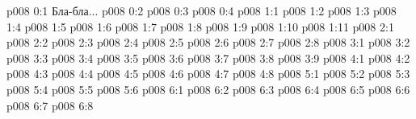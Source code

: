 \author{Божественный Советник}
\vs p008 0:1  Бла-бла...
\vs p008 0:2 
\vs p008 0:3 
\vs p008 0:4 \pc 
{}
\vs p008 1:1 
\vs p008 1:2 
\vs p008 1:3 
\vs p008 1:4 \pc 
\vs p008 1:5 
\vs p008 1:6 
\vs p008 1:7 \pc 
\vs p008 1:8 \pc 
\vs p008 1:9 
\vs p008 1:10 \pc 
\vs p008 1:11 
\vs p008 2:1 
\vs p008 2:2 \pc 
\vs p008 2:3 
\vs p008 2:4 \pc 
\vs p008 2:5 \pc 
\vs p008 2:6 
\vs p008 2:7 
\vs p008 2:8 
\vs p008 3:1 
\vs p008 3:2 
\vs p008 3:3 
\vs p008 3:4 
\vs p008 3:5 \pc 
\vs p008 3:6 
\vs p008 3:7 
\vs p008 3:8 
\vs p008 3:9 
\vs p008 4:1 
\vs p008 4:2 
\vs p008 4:3 
\vs p008 4:4 \pc 
\vs p008 4:5 
\vs p008 4:6 
\vs p008 4:7 \pc 
\vs p008 4:8 
\vs p008 5:1 
\vs p008 5:2 
\vs p008 5:3 \pc 
\vs p008 5:4 \pc 
\vs p008 5:5 
\vs p008 5:6 
\vs p008 6:1 
\vs p008 6:2 
\vs p008 6:3 
\vs p008 6:4 
\vs p008 6:5 
\vs p008 6:6 \pc 
\vs p008 6:7 
\vsetoff
\vs p008 6:8 
\quizlink
